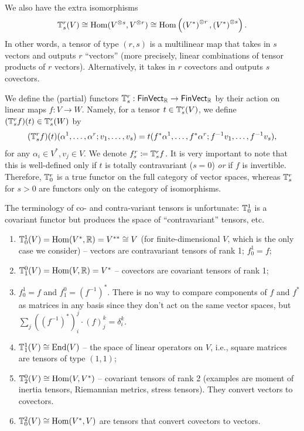 We also have the extra isomorphisms
\[
\mathbb{T}^r_s(V)\cong \operatorname{Hom}(V^{\otimes s},V^{\otimes r})\cong \operatorname{Hom}\left(\left(V^\ast\right)^{\otimes r},\left(V^\ast\right)^{\otimes s}\right).
\]
In other words, a tensor of type $(r,s)$ is a multilinear map that takes in $s$ vectors and outputs $r$ ``vectors'' (more precisely, linear combinations of tensor products of $r$ vectors). Alternatively, it takes in $r$ covectors and outputs $s$ covectors.

\begin{defn}
    We define the (partial) functors $\mathbb{T}^r_s:\mathsf{FinVect_{\mathbb{R}} }\to\mathsf{FinVect}_{\mathbb{R}} $ by their action on linear maps $f:V\to W$. Namely, for a tensor $t\in \mathbb{T}^r_s(V)$, we define $(\mathbb{T}^r_sf)(t)\in \mathbb{T}^r_s(W)$ by
    \[
    (\mathbb{T}^r_sf)(t)(\alpha^1,\ldots,\alpha^r;v_1,\ldots,v_s)=t(f^\ast\alpha^1,\ldots,f^\ast\alpha^r;f^{-1}v_1,\ldots,f^{-1}v_s),
    \]
    for any $\alpha_i\in V^\ast,v_j\in V$. We denote $f^r_s\coloneqq \mathbb{T}^r_s f$. It is very important to note that this is well-defined only if $t$ is totally contravariant ($s=0$) \emph{or} if $f$ is invertible. Therefore, $\mathbb{T}^r_0$ is a true functor on the full category of vector spaces, whereas $\mathbb{T}^r_s$ for $s>0$ are functors only on the category of isomorphisms.
\end{defn}

\begin{rem}
    The terminology of co- and contra-variant tensors is unfortunate: $\mathbb{T}_0^1$ is a covariant functor but produces the space of ``contravariant'' tensors, etc.
\end{rem}

\begin{example}
\begin{enumerate}
    \item $\mathbb{T}_0^1(V)=\operatorname{Hom}(V^\ast,\mathbb{R} )=V^{\ast\ast}\cong V$ (for finite-dimensional $V$, which is the only case we consider) -- vectors are contravariant tensors of rank 1; $f^1_0=f$;
    \item $\mathbb{T}_1^0(V)=\operatorname{Hom}(V,\mathbb{R} )=V^\ast$ -- covectors are covariant tensors of rank 1;
    \item $f^1_0=f$ and $f^0_1=\left(f^{-1}\right)^\ast$. There is no way to compare components of $f$ and $f^\ast$ as matrices in any basis since they don't act on the same vector spaces, but $\sum_j \left(\left(f^{-1}\right)^\ast\right)_i^j \cdot (f)_j^k=\delta_i^k$.
    \item $\mathbb{T}^1_1(V)\cong \operatorname{End}(V)$ -- the space of linear operators on $V$, i.e., square matrices are tensors of type $(1,1)$;
    \item $\mathbb{T}^0_2(V)\cong\operatorname{Hom}(V,V^\ast)$ -- covariant tensors of rank 2 (examples are moment of inertia tensors, Riemannian metrics, stress tensors). They convert vectors to covectors.
    \item $\mathbb{T}^2_0(V)\cong\operatorname{Hom}(V^\ast ,V)$ are tensors that convert covectors to vectors.
\end{enumerate}
\end{example}

